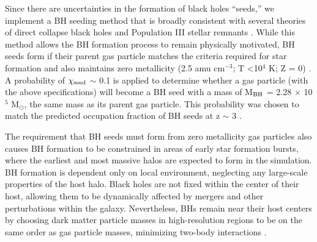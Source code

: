 \documentclass[manuscript]{aastex}
\begin{document}
Since there are uncertainties in the formation of black holes ``seeds,'' we implement a BH seeding method that is broadly consistent with several theories of direct collapse black holes \citep{Couchman1986, Abel2002, Bromm2004} and Population III stellar remnants \citep{Loeb1994, Eisenstein1995, Koushiappas2004, Begelman2006, Lodato2006}. While this method allows the BH formation process to remain physically motivated, BH seeds form if their parent gas particle matches the criteria required for star formation and also maintains zero metallicity (2.5 amu cm$^{-3}$; T \textless 10$^4$ K; Z = 0) \citep{Stinson2006}. A probability of $\chi_{\rm seed}$ $\sim$ 0.1 is applied to determine whether a gas particle (with the above specifications) will become a BH seed with a mass of M$_{\rm BH}$ = 2.28 $\times$ 10$^5$ M$_{\odot}$, the same mass as its parent gas particle. This probability was chosen to match the predicted occupation fraction of BH seeds at z $\sim$ 3 \citep{Volonteri2008}.

The requirement that BH seeds must form from zero metallicity gas particles also causes BH formation to be constrained in areas of early star formation bursts, where the earliest and most massive halos are expected to form in the simulation. BH formation is dependent only on local environment, neglecting any large-scale properties of the host halo. Black holes are not fixed within the center of their host, allowing them to be dynamically affected by mergers and other perturbations within the galaxy. Nevertheless, BHs remain near their host centers by choosing dark matter particle masses in high-resolution regions to be on the same order as gas particle masses, minimizing two-body interactions \citep{Bellovary2011}.
\end{document}
